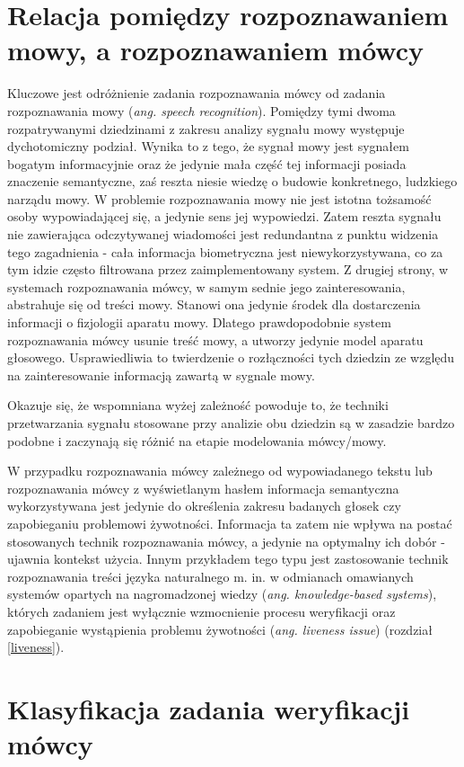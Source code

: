 \section{Relacja pomiędzy rozpoznawaniem mowy, a rozpoznawaniem mówcy}
Kluczowe jest odróżnienie zadania rozpoznawania mówcy od zadania rozpoznawania mowy (\textit{ang. speech recognition}). Pomiędzy tymi dwoma rozpatrywanymi dziedzinami z zakresu analizy sygnału mowy występuje dychotomiczny podział. Wynika to z tego, że sygnał mowy jest sygnałem bogatym informacyjnie oraz że jedynie mała część tej informacji posiada znaczenie semantyczne, zaś reszta niesie wiedzę o budowie konkretnego, ludzkiego narządu mowy. W problemie rozpoznawania mowy nie jest istotna tożsamość osoby wypowiadającej się, a jedynie sens jej wypowiedzi. Zatem reszta sygnału nie zawierająca odczytywanej wiadomości jest redundantna z punktu widzenia tego zagadnienia - cała informacja biometryczna jest niewykorzystywana, co za tym idzie często filtrowana przez zaimplementowany system. Z drugiej strony, w systemach rozpoznawania mówcy, w samym sednie jego zainteresowania, abstrahuje się od treści mowy. Stanowi ona jedynie środek dla dostarczenia informacji o fizjologii aparatu mowy. Dlatego prawdopodobnie system rozpoznawania mówcy usunie treść mowy, a utworzy jedynie model aparatu głosowego. Usprawiedliwia to twierdzenie o rozłączności tych dziedzin ze względu na zainteresowanie informacją zawartą w sygnale mowy. 

Okazuje się, że wspomniana wyżej zależność powoduje to, że techniki przetwarzania sygnału stosowane przy analizie obu dziedzin są w zasadzie bardzo podobne i zaczynają się różnić na etapie modelowania mówcy/mowy. 

W przypadku rozpoznawania mówcy zależnego od wypowiadanego tekstu lub rozpoznawania mówcy z wyświetlanym hasłem informacja semantyczna wykorzystywana jest jedynie do określenia zakresu badanych głosek czy zapobieganiu problemowi żywotności. Informacja ta zatem nie wpływa na postać stosowanych technik rozpoznawania mówcy, a jedynie na optymalny ich dobór - ujawnia kontekst użycia. Innym przykładem tego typu jest zastosowanie technik rozpoznawania treści języka naturalnego m. in. w odmianach
omawianych systemów opartych na nagromadzonej wiedzy (\textit{ang. knowledge-based systems}), których zadaniem jest wyłącznie wzmocnienie procesu weryfikacji oraz zapobieganie wystąpienia problemu żywotności (\textit{ang. liveness issue}) (rozdział \ref{liveness}). 

\section{Klasyfikacja zadania weryfikacji mówcy}
